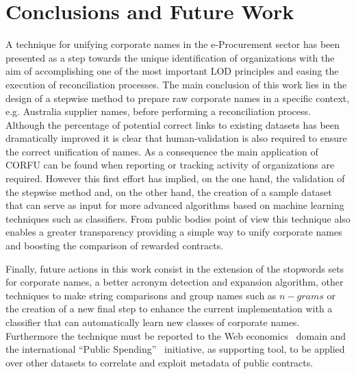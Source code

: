 \documentclass{llncs}
\begin{document}
\section{Conclusions and Future Work}
A technique for unifying corporate names in the e-Procurement sector has been 
presented as a step towards the unique identification of organizations 
with the aim of accomplishing one of the most important LOD principles 
and easing the execution of reconciliation processes. The main conclusion of this work 
lies in the design of a stepwise method to prepare raw corporate names in a specific 
context, e.g. Australia supplier names, before performing a reconciliation process. 
Although the percentage of potential correct links to existing datasets has been dramatically 
improved it is clear that human-validation is also required to ensure the 
correct unification of names. As a consequence the main application of CORFU 
can be found when reporting or tracking activity of organizations are required. 
However this first effort has implied, on the one hand, the validation 
of the stepwise method and, on the other hand, the creation of a sample dataset 
that can serve as input for more advanced algorithms based on machine learning 
techniques such as classifiers. From public bodies point of view 
this technique also enables a greater transparency providing a simple 
way to unify corporate names and boosting the comparison of rewarded contracts.

Finally, future actions in this work consist in the extension of the stopwords sets 
for corporate names, a better acronym detection and expansion algorithm, other techniques to 
make string comparisons and group names such as $n-grams$ or the creation of a new final step to enhance 
the current implementation with a classifier that can automatically learn new classes of corporate names. 
Furthermore the technique must be reported to the Web economics~\cite{vaf2012} domain and the international ``Public Spending''~\cite{vaf2012a} initiative, as supporting tool, 
to be applied over other datasets to correlate and exploit metadata of public contracts.

% 
\end{document}
